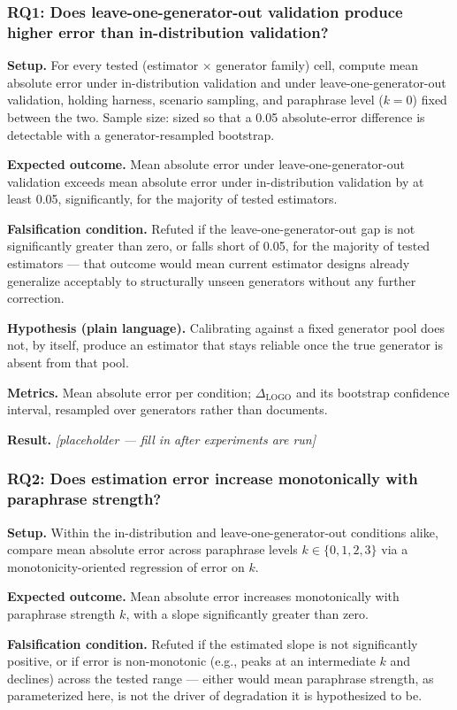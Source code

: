 \documentclass[11pt]{article}
\newcommand{\ph}{\textit{[placeholder --- fill in after experiments are run]}}
\begin{document}
\subsubsection{RQ1: Does leave-one-generator-out validation produce higher error than in-distribution validation?}
\textbf{Setup.} For every tested (estimator $\times$ generator family) cell, compute mean absolute error under in-distribution validation and under leave-one-generator-out validation, holding harness, scenario sampling, and paraphrase level ($k=0$) fixed between the two. Sample size: sized so that a 0.05 absolute-error difference is detectable with a generator-resampled bootstrap.

\textbf{Expected outcome.} Mean absolute error under leave-one-generator-out validation exceeds mean absolute error under in-distribution validation by at least 0.05, significantly, for the majority of tested estimators.

\textbf{Falsification condition.} Refuted if the leave-one-generator-out gap is not significantly greater than zero, or falls short of 0.05, for the majority of tested estimators --- that outcome would mean current estimator designs already generalize acceptably to structurally unseen generators without any further correction.

\textbf{Hypothesis (plain language).} Calibrating against a fixed generator pool does not, by itself, produce an estimator that stays reliable once the true generator is absent from that pool.

\textbf{Metrics.} Mean absolute error per condition; $\Delta_{\text{LOGO}}$ and its bootstrap confidence interval, resampled over generators rather than documents.

\textbf{Result.} \ph

\subsubsection{RQ2: Does estimation error increase monotonically with paraphrase strength?}
\textbf{Setup.} Within the in-distribution and leave-one-generator-out conditions alike, compare mean absolute error across paraphrase levels $k \in \{0,1,2,3\}$ via a monotonicity-oriented regression of error on $k$.

\textbf{Expected outcome.} Mean absolute error increases monotonically with paraphrase strength $k$, with a slope significantly greater than zero.

\textbf{Falsification condition.} Refuted if the estimated slope is not significantly positive, or if error is non-monotonic (e.g., peaks at an intermediate $k$ and declines) across the tested range --- either would mean paraphrase strength, as parameterized here, is not the driver of degradation it is hypothesized to be.
\end{document}

